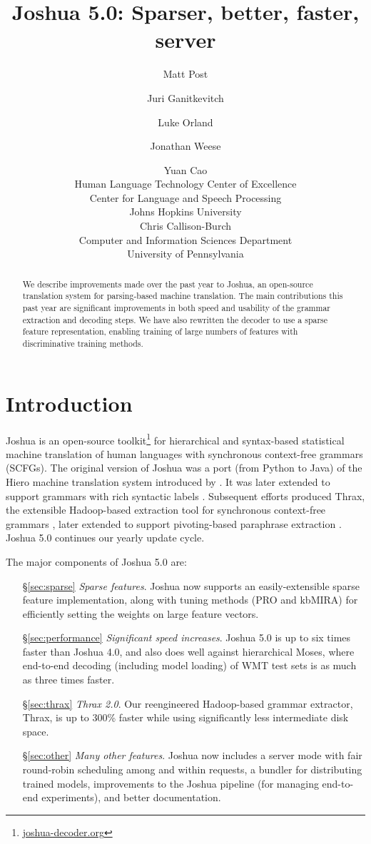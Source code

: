 \documentclass[11pt]{article}
\title{Joshua 5.0: Sparser, better, faster, server}
\author{Matt Post\hltcoe 
  \and Juri Ganitkevitch\clsp 
  \and Luke Orland\hltcoe
  \and Jonathan Weese\clsp
  \and Yuan Cao\clsp  \\
  \hltcoe Human Language Technology Center of Excellence \\
  \clsp Center for Language and Speech Processing \\
  Johns Hopkins University \\
  \AND  Chris Callison-Burch \\
  Computer and Information Sciences Department \\
  University of Pennsylvania \\
}
\date{}
\begin{document}
\maketitle

\begin{abstract}
  We describe improvements made over the past year to Joshua, an
  open-source translation system for parsing-based machine
  translation. The main contributions this past year are significant
  improvements in both speed and usability of the grammar extraction
  and decoding steps. We have also rewritten the decoder to use a
  sparse feature representation, enabling training of large numbers of
  features with discriminative training methods.
\end{abstract}

\section{Introduction}
\label{sec-intro}

Joshua is an open-source toolkit\footnote{\url{joshua-decoder.org}}
for hierarchical and syntax-based statistical machine translation of
human languages with synchronous context-free grammars (SCFGs).  The original version of Joshua \cite{Joshua-WMT} was
a port (from Python to Java) of the Hiero machine translation system
introduced by .  It was later extended to support
grammars with rich syntactic labels \cite{li2010joshua}. Subsequent
efforts produced Thrax, the extensible Hadoop-based extraction tool
for synchronous context-free grammars \cite{Joshua-3.0}, later
extended to support pivoting-based paraphrase extraction
\cite{Joshua-4.0}. Joshua 5.0 continues our yearly update cycle. 

The major components of Joshua 5.0 are:

\begin{itemize}
  \item[\S\ref{sec:sparse}] \emph{Sparse features}. Joshua now supports an
    easily-extensible sparse feature implementation, along with tuning
    methods (PRO and kbMIRA) for efficiently setting the weights on
    large feature vectors.
  \item[\S\ref{sec:performance}] \emph{Significant speed
    increases}. Joshua 5.0 is up to six times faster than Joshua 4.0,
    and also does well against hierarchical Moses, where end-to-end
    decoding (including model loading) of WMT test sets is as much as
    three times faster.
  \item[\S\ref{sec:thrax}] \emph{Thrax 2.0}. Our reengineered
    Hadoop-based grammar extractor, Thrax, is up to 300\% faster while
    using significantly less intermediate disk space.
  \item[\S\ref{sec:other}] \emph{Many other features}. Joshua now
    includes a server mode with fair round-robin scheduling among and
    within requests, a bundler for distributing trained models,
    improvements to the Joshua pipeline (for managing end-to-end
    experiments), and better documentation.
\end{itemize}
\end{document}

